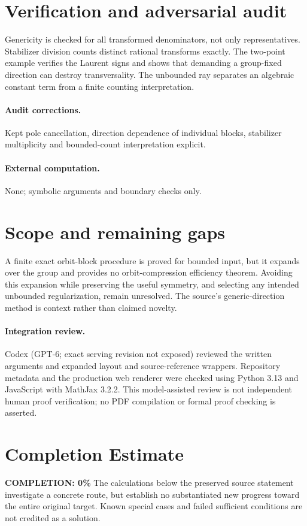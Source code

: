 \documentclass[11pt]{article}
\begin{document}
\section{Verification and adversarial audit}
Genericity is checked for all transformed denominators, not only representatives. Stabilizer division counts distinct rational transforms exactly. The two-point example verifies the Laurent signs and shows that demanding a group-fixed direction can destroy transversality. The unbounded ray separates an algebraic constant term from a finite counting interpretation.
\paragraph{Audit corrections.} Kept pole cancellation, direction dependence of individual blocks, stabilizer multiplicity and bounded-count interpretation explicit.
\paragraph{External computation.} None; symbolic arguments and boundary checks only.
\section{Scope and remaining gaps}
A finite exact orbit-block procedure is proved for bounded input, but it expands over the group and provides no orbit-compression efficiency theorem. Avoiding this expansion while preserving the useful symmetry, and selecting any intended unbounded regularization, remain unresolved. The source's generic-direction method is context rather than claimed novelty.
\paragraph{Integration review.} Codex (GPT-6; exact serving revision not exposed) reviewed the written arguments and expanded layout and source-reference wrappers. Repository metadata and the production web renderer were checked using Python 3.13 and JavaScript with MathJax 3.2.2. This model-assisted review is not independent human proof verification; no PDF compilation or formal proof checking is asserted.

\section{Completion Estimate}
\noindent\textbf{COMPLETION: 0\%}
The calculations below the preserved source statement investigate a concrete route,
but establish no substantiated new progress toward the entire original target.
Known special cases and failed sufficient conditions are not credited as a solution.
\end{document}
